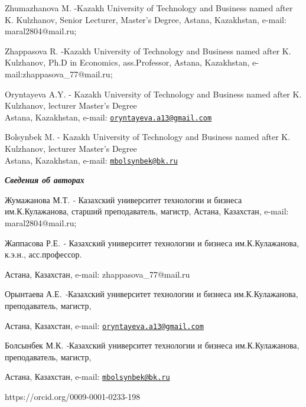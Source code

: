 Zhumazhanova M. -Kazakh University of Technology and Business named
after K. Kulzhanov, Senior Lecturer, Master's Degree, Astana,
Kazakhstan, e-mail: maral2804@mail.ru;

Zhappasova R. -Kazakh University of Technology and Business named after
K. Kulzhanov, Ph.D in Economics, ass.Professor, Astana, Kazakhstan,
e-mail:zhappasova\_77@mail.ru;

Oryntayeva A.Y. - Kazakh University of Technology and Business named
after K. Kulzhanov, lecturer Master's Degree\\
Astana, Kazakhstan, e-mail:
\href{mailto:oryntayeva.a13@gmail.com}{\nolinkurl{oryntayeva.a13@gmail.com}}

Bolsynbek M. - Kazakh University of Technology and Business named after
K. Kulzhanov, lecturer Master's Degree\\
Astana, Kazakhstan, e-mail:
\href{mailto:mbolsynbek@bk.ru}{\nolinkurl{mbolsynbek@bk.ru}}

\emph{{\bfseries Сведения об авторах}}

Жумажанова М.Т. \emph{-} Казахский университет технологии и бизнеса
им.К.Кулажанова, старший преподаватель, магистр, Астана, Казахстан,
e-mail: maral2804@mail.ru;

Жаппасова Р.Е. \emph{-} Казахский университет технологии и бизнеса
им.К.Кулажанова, к.э.н., асс.профессор.

Астана, Казахстан, e-mail: zhappasova\_77@mail.ru

Орынтаева А.Е\emph{. -}Казахский университет технологии и бизнеса
им.К.Кулажанова, преподаватель, магистр,

Астана, Казахстан, e-mail:
\href{mailto:oryntayeva.a13@gmail.com}{\nolinkurl{oryntayeva.a13@gmail.com}}

Болсынбек М.К. \emph{-}Казахский университет технологии и бизнеса
им.К.Кулажанова, преподаватель, магистр,

Астана, Казахстан, e-mail:
\href{mailto:mbolsynbek@bk.ru}{\nolinkurl{mbolsynbek@bk.ru}}

https://orcid.org/0009-0001-0233-198